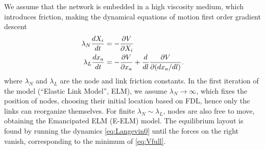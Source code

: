 \documentclass[nofootinbib,preprint,floatfix,titlepage,endfloats]{revtex4} %
\begin{document}

We %
assume that the network is embedded in a high viscosity medium, which introduces friction, making the dynamical equations of motion first order gradient descent 
\begin{align}
    \lambda_N {dX_i\over dt} &= -{\ro V \over \ro X_i} %
    \label{eq:nodes}\\
    \lambda_L {dx_a \over dt} & =  -{\ro V \over \ro x_a} + {d\over dl} {\ro V \over \ro (dx_a /dl)}   \label{eq:Langevin0}.
\end{align}
where $\lambda_N$ and $\lambda_L$ are the node and link friction constants. 
In the first iteration of the model (``Elastic Link Model'', ELM), we assume $\lambda_N\to \infty$, which fixes the position of nodes, choosing their initial location based on FDL, hence only the links can reorganize themselves.  
For finite $\lambda_N \sim \lambda_L$, nodes are also free to move, obtaining the Emancipated ELM (E-ELM) model. 
The equilibrium layout is found by %
running the dynamics  \eqref{eq:Langevin0} until the forces on the right %
vanish, corresponding to the minimum of \eqref{eq:Vfull}.

\end{document}
